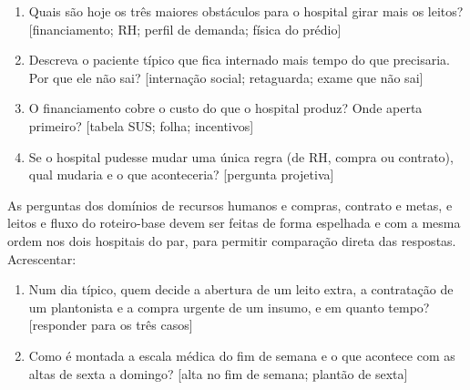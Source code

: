 \begin{enumerate}[itemsep=2pt]
  \item Quais são hoje os três maiores obstáculos para o hospital girar mais os leitos? [financiamento; RH; perfil de demanda; física do prédio]
  \par\nopagebreak{}
  \item Descreva o paciente típico que fica internado mais tempo do que precisaria. Por que ele não sai? [internação social; retaguarda; exame que não sai]
  \par\nopagebreak{}
  \item O financiamento cobre o custo do que o hospital produz? Onde aperta primeiro? [tabela SUS; folha; incentivos]
  \par\nopagebreak{}
  \item Se o hospital pudesse mudar uma única regra (de RH, compra ou contrato), qual mudaria e o que aconteceria? [pergunta projetiva]
  \par\nopagebreak{}
\end{enumerate}


As perguntas dos domínios de recursos humanos e compras, contrato e
metas, e leitos e fluxo do roteiro-base devem ser feitas de forma
espelhada e com a mesma ordem nos dois hospitais do par, para permitir
comparação direta das respostas. Acrescentar:

\begin{enumerate}[itemsep=2pt]
  \item Num dia típico, quem decide a abertura de um leito extra, a contratação de um plantonista e a compra urgente de um insumo, e em quanto tempo? [responder para os três casos]
  \par\nopagebreak{}
  \item Como é montada a escala médica do fim de semana e o que acontece com as altas de sexta a domingo? [alta no fim de semana; plantão de sexta]
  \par\nopagebreak{}
\end{enumerate}

